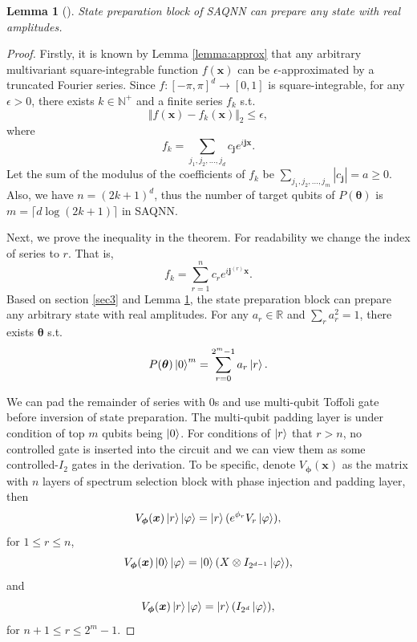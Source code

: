 \documentclass{article}
\theoremstyle{plain}
\newtheorem{lemma}[theorem]{Lemma}
\theoremstyle{definition}
\theoremstyle{remark}
\begin{document}
\begin{lemma}[\cite{sun2023}]\label{lemma:real}
    State preparation block of SAQNN can prepare any state with real amplitudes.
\end{lemma}
\thmone*
\begin{proof}
Firstly, it is known by Lemma \ref{lemma:approx} that any arbitrary multivariant square-integrable function $f(\boldsymbol{x})$ can be $\epsilon$-approximated by a truncated Fourier series. Since $f:[-\pi,\pi]^d\rightarrow [0,1]$ is square-integrable, for any $\epsilon>0$, there exists $k\in \mathbb{N}^+$ and a finite series $f_k$ s.t.
$$
\Vert f(\boldsymbol{x})-f_k(\boldsymbol{x})\Vert_2 \leq \epsilon,
$$
where
$$
f_k = \sum_{j_1,j_2,...,j_d} c_{\boldsymbol{j}}e^{i\boldsymbol{j}\boldsymbol{x}}.
$$
Let the sum of the modulus of the coefficients of $f_k$ be $\sum_{j_1,j_2,...,j_m}|c_{\boldsymbol{j}}| = a\geq 0$. Also, we have $n=(2k+1)^d$, thus the number of target qubits of $P(\boldsymbol{\theta})$ is $m=\lceil d\log (2k+1)\rceil$ in SAQNN. 

Next, we prove the inequality in the theorem. For readability we change the index of series to $r$. That is, 
$$
f_k = \sum_{r=1}^{n} c_{r}e^{i\boldsymbol{j}^{(r)}\boldsymbol{x}}.
$$
Based on section \ref{sec3} and Lemma \ref{lemma:real}, the state preparation block can prepare any arbitrary state with real amplitudes. For any $a_r\in \mathbb{R}$ and $\sum_{r}a_r^2=1$, there exists $\boldsymbol{\theta}$ s.t.
$$
P(\boldsymbol{\theta})\ket{0}^m = \sum_{r=0}^{2^m-1} a_r \ket{r}.
$$

We can pad the remainder of series with 0s and use multi-qubit Toffoli gate before inversion of state preparation. The multi-qubit padding layer is under condition of top $m$ qubits being $\ket{0}$. For conditions of $\ket{r}$ that $r > n$, no controlled gate is inserted into the circuit and we can view them as some controlled-$I_2$ gates in the derivation. To be specific, denote $V_{\boldsymbol{\phi}}(\boldsymbol{x})$ as the matrix with $n$ layers of spectrum selection block with phase injection and padding layer, then
$$
V_{\boldsymbol{\phi}}(\boldsymbol{x})\ket{r}\ket{\varphi} = \ket{r}(e^{\phi_r}V_r\ket{\varphi}),
$$
for $1\leq r\leq n$,
$$
V_{\boldsymbol{\phi}}(\boldsymbol{x})\ket{0}\ket{\varphi} = \ket{0}(X\otimes I_{2^{d-1}}\ket{\varphi}),
$$
and 
$$
V_{\boldsymbol{\phi}}(\boldsymbol{x})\ket{r}\ket{\varphi} = \ket{r}(I_{2^{d}}\ket{\varphi}),
$$
for $n+1\leq r\leq 2^m-1$.


\end{proof}
\end{document}

